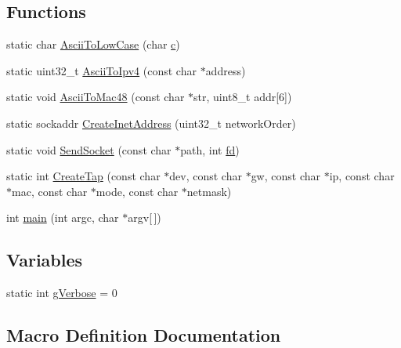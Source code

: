 \subsection*{Functions}
\begin{DoxyCompactItemize}
\item 
static char \hyperlink{tap-creator_8cc_ac8511bf2d0acbb99fa4b9a0662b1000c}{Ascii\+To\+Low\+Case} (char \hyperlink{mmwave_2model_2fading-traces_2fading__trace__generator_8m_ae0323a9039add2978bf5b49550572c7c}{c})
\item 
static uint32\+\_\+t \hyperlink{tap-creator_8cc_ac1b8e624182192ac85e3e35876d6e152}{Ascii\+To\+Ipv4} (const char $\ast$address)
\item 
static void \hyperlink{tap-creator_8cc_aeb9510b65095fe530be572d2261f72f7}{Ascii\+To\+Mac48} (const char $\ast$str, uint8\+\_\+t addr\mbox{[}6\mbox{]})
\item 
static sockaddr \hyperlink{tap-creator_8cc_a47df9fd87752509424a35340e868acd1}{Create\+Inet\+Address} (uint32\+\_\+t network\+Order)
\item 
static void \hyperlink{tap-creator_8cc_a11a114b8401a27939e87a94ade65213a}{Send\+Socket} (const char $\ast$path, int \hyperlink{mmwave_2model_2fading-traces_2fading__trace__generator_8m_a44f21d5190b5a6df8089f54799628d7e}{fd})
\item 
static int \hyperlink{tap-creator_8cc_ac41e53836dbd8b7f8a73bf8425df1d65}{Create\+Tap} (const char $\ast$dev, const char $\ast$gw, const char $\ast$ip, const char $\ast$mac, const char $\ast$mode, const char $\ast$netmask)
\item 
int \hyperlink{tap-creator_8cc_a0ddf1224851353fc92bfbff6f499fa97}{main} (int argc, char $\ast$argv\mbox{[}$\,$\mbox{]})
\end{DoxyCompactItemize}
\subsection*{Variables}
\begin{DoxyCompactItemize}
\item 
static int \hyperlink{tap-creator_8cc_a80b7a0563409f3e21c80e0459c85845e}{g\+Verbose} = 0
\end{DoxyCompactItemize}


\subsection{Macro Definition Documentation}
